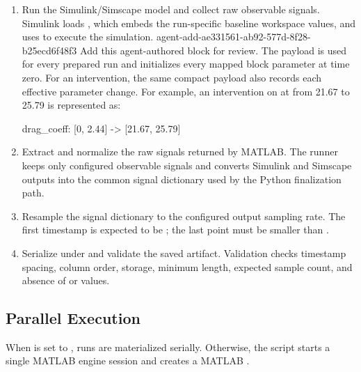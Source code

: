 \documentclass[11pt]{article}
\begin{document}
\begin{enumerate}
\item Run the Simulink/Simscape model and collect raw observable signals.
Simulink loads , which embeds the run-specific baseline workspace values, and uses  to execute the simulation.
\agentProposedEdit
  {agent-add-ae331561-ab92-577d-8f28-b25ecd6f48f3}
  {Add this agent-authored block for review.}
  {}
  {The  payload is used for every prepared run and initializes every mapped block parameter at time zero.
For an intervention, the same compact payload also records each effective parameter change.}
For example, an intervention on  at  from 21.67 to 25.79 is represented as:
\begin{DocCode}
drag_coeff: [0, 2.44] -> [21.67, 25.79]
\end{DocCode}


\item Extract and normalize the raw signals returned by MATLAB.
The runner keeps only configured observable signals and converts Simulink and Simscape outputs into the common signal dictionary
used by the Python finalization path.

\item Resample the signal dictionary to the configured output sampling rate.
The first timestamp is expected to be ; the last point must be smaller than
.

\item Serialize  under  and validate the saved artifact.
Validation checks timestamp spacing, column order,  storage, minimum length, expected sample count, and absence of
 or  values.
\end{enumerate}

\subsection*{Parallel Execution}
When  is set to , runs are materialized serially.
Otherwise, the script starts a single MATLAB engine session and creates a MATLAB .
\end{document}
